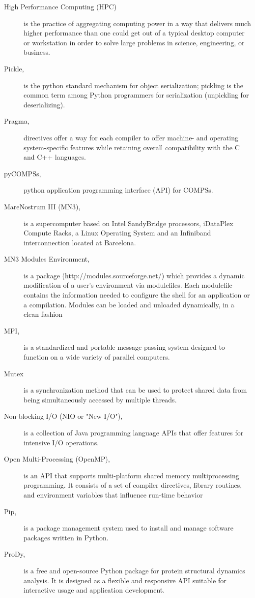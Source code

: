 \begin{description}
\item [High Performance Computing (HPC)] is the practice of aggregating computing power in a way that delivers much higher performance than one could get out of a typical desktop computer or workstation in order to solve large problems in science, engineering, or business.
\item [Pickle,] is the python standard mechanism for object serialization; pickling is the common term among Python programmers for serialization (unpickling for deserializing).
\item [Pragma,] directives offer a way for each compiler to offer machine- and operating system-specific features while retaining overall compatibility with the C and C++ languages.
\item[pyCOMPSs,] python application programming interface (API) for COMPSs.
\item  [MareNostrum III (MN3),]  is a supercomputer based on Intel SandyBridge processors, iDataPlex Compute Racks, a Linux Operating System and an Infiniband interconnection located at Barcelona.
\item [MN3 Modules Environment,] is a package (http://modules.sourceforge.net/) which provides a dynamic modification of a user's environment via modulefiles. Each modulefile contains the information needed to configure the shell for an application or a compilation. Modules can be loaded and unloaded dynamically,
in a clean fashion
\item[MPI,] is a standardized and portable message-passing system designed to function on a wide variety of parallel computers.
\item [Mutex] is a synchronization method that can be used to protect shared data from being simultaneously accessed by multiple threads.
\item [Non-blocking I/O (NIO or "New I/O"),] is a collection of Java programming language APIs that offer features for intensive I/O operations. 
\item [Open Multi-Processing (OpenMP),] is an API that supports multi-platform shared memory multiprocessing programming. It consists of a set of compiler directives, library routines, and environment variables that influence run-time behavior
\item [Pip,] is a package management system used to install and manage software packages written in Python.
\item [ProDy,] is a free and open-source Python package for protein structural dynamics analysis. It is designed as a flexible and responsive API suitable for interactive usage and application development.

\end{description}
